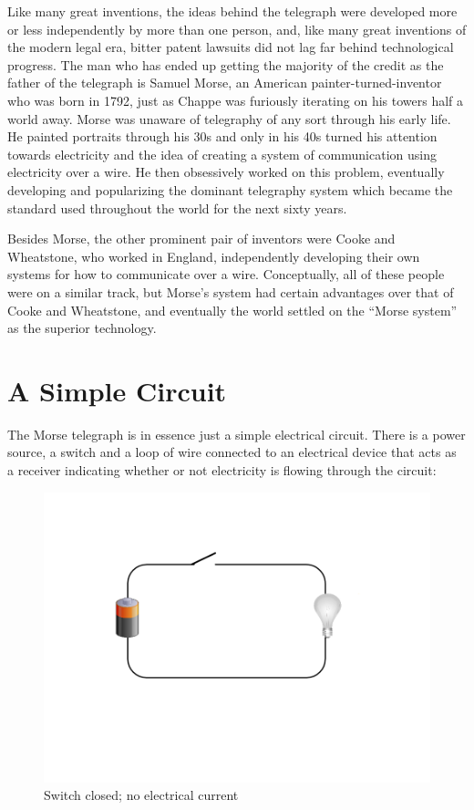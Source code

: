 \documentclass[UTF8]{book}
\begin{document}
\begin{CJK}{UTF8}{gbsn}
Like many great inventions, the ideas behind the telegraph were developed more or less independently by more than one person, and, like many great inventions of the modern legal era, bitter patent lawsuits did not lag far behind technological progress. The man who has ended up getting the majority of the credit as the father of the telegraph is Samuel Morse, an American painter-turned-inventor who was born in 1792, just as Chappe was furiously iterating on his towers half a world away. Morse was unaware of telegraphy of any sort through his early life. He painted portraits through his 30s and only in his 40s turned his attention towards electricity and the idea of creating a system of communication using electricity over a wire. He then obsessively worked on this problem, eventually developing and popularizing the dominant telegraphy system which became the standard used throughout the world for the next sixty years.

Besides Morse, the other prominent pair of inventors were Cooke and Wheatstone, who worked in England, independently developing their own systems for how to communicate over a wire. Conceptually, all of these people were on a similar track, but Morse's system had certain advantages over that of Cooke and Wheatstone, and eventually the world settled on the ``Morse system'' as the superior technology.

\section{A Simple Circuit}

The Morse telegraph is in essence just a simple electrical circuit. There is a power source, a switch and a loop of wire connected to an electrical device that acts as a receiver indicating whether or not electricity is flowing through the circuit:

\begin{figure}[H]
\centering
\includegraphics[width=0.8\linewidth]{circuit1}
\caption{Switch closed; no electrical current}
\end{figure}


\end{CJK}
\end{document}
